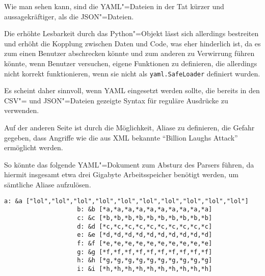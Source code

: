                 

                Wie man sehen kann,
                sind die
                \gls{YAML}"=Dateien in der Tat kürzer und
                aussagekräftiger,
                als die
                \gls{JSON}"=Dateien.

                Die erhöhte Lesbarkeit durch das Python"=Objekt lässt sich allerdings bestreiten und
                erhöht die Kopplung zwischen Daten und
                Code,
                was eher hinderlich ist,
                da es zum einen Benutzer abschrecken könnte und
                zum anderen zu Verwirrung führen könnte,
                wenn Benutzer versuchen,
                eigene Funktionen zu definieren,
                die allerdings nicht korrekt funktionieren,
                wenn sie nicht als
                \lstinline{yaml.SafeLoader} definiert wurden.

                Es scheint daher sinnvoll,
                wenn
                \gls{YAML} eingesetzt werden sollte,
                die bereits in den
                \gls{CSV}"= und
                \gls{JSON}"=Dateien gezeigte Syntax für reguläre Ausdrücke zu verwenden.

                Auf der anderen Seite ist durch die Möglichkeit,
                Aliase zu definieren,
                die Gefahr gegeben,
                dass Angriffe
                wie die aus
                \gls{XML} bekannte
                \foreignquote{english}{Billion Laughs Attack} ermöglicht werden.

                So könnte das folgende
                \gls{YAML}"=Dokument zum Absturz des Parsers führen,
                da hiermit insgesamt etwa drei Gigabyte Arbeitsspeicher benötigt werden,
                um sämtliche Aliase aufzulösen.\cite{RIB2018}

                \begin{lstlisting}[caption={Billion Laughs Attacke gegen YAML}, gobble=20]
                    a: &a ["lol","lol","lol","lol","lol","lol","lol","lol","lol","lol"]
                    b: &b [*a,*a,*a,*a,*a,*a,*a,*a,*a,*a]
                    c: &c [*b,*b,*b,*b,*b,*b,*b,*b,*b,*b]
                    d: &d [*c,*c,*c,*c,*c,*c,*c,*c,*c,*c]
                    e: &e [*d,*d,*d,*d,*d,*d,*d,*d,*d,*d]
                    f: &f [*e,*e,*e,*e,*e,*e,*e,*e,*e,*e]
                    g: &g [*f,*f,*f,*f,*f,*f,*f,*f,*f,*f]
                    h: &h [*g,*g,*g,*g,*g,*g,*g,*g,*g,*g]
                    i: &i [*h,*h,*h,*h,*h,*h,*h,*h,*h,*h]
                \end{lstlisting}

